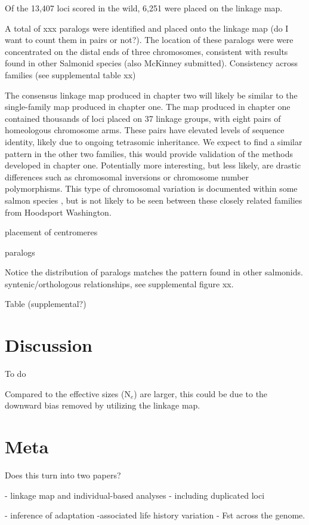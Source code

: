 \documentclass[12pt, one column]{article}
\begin{document}
Of the 13,407 loci scored in the wild, 6,251 were placed on the linkage map. 

A total of xxx paralogs were identified and placed onto the linkage map (do I want to count them in pairs or not?).  The location of these paralogs were were concentrated on the distal ends of three chromosomes, consistent with results found in other Salmonid species  \citep{Brieuc2014, Kodama2014, Waples2015} (also McKinney submitted). Consistency across families (see supplemental table xx)

The consensus linkage map produced in chapter two will likely be similar to the single-family map produced in chapter one.  The map produced in chapter one contained thousands of loci placed on 37 linkage groups, with eight pairs of homeologous chromosome arms.  These pairs have elevated levels of sequence identity, likely due to ongoing tetrasomic inheritance.  We expect to find a similar pattern in the other two families, this would provide validation of the methods developed in chapter one. Potentially more interesting, but less likely, are drastic differences such as chromosomal inversions or chromosome number polymorphisms.  This type of chromosomal variation is documented within some salmon species \citep{Phillips2001}, but is not likely to be seen between these closely related families from Hoodsport Washington.

placement of centromeres

paralogs

Notice the distribution of paralogs matches the  pattern found in other salmonids.
syntenic/orthologous relationships, see supplemental figure xx.

Table (supplemental?)

\section*{Discussion}
To do

Compared to \citet{Small2014} the effective sizes (N$_{e}$) are larger, this could be due to the downward bias removed by utilizing the linkage map.

\section*{Meta}
Does this turn into two papers?

 - linkage map and individual-based analyses - including duplicated loci

 - inference of adaptation -associated  life history variation  - Fst across the genome.
\end{document}
